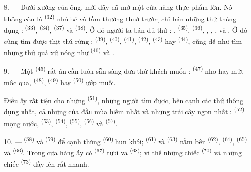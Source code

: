 8. --- Dưới xưởng của ông, mới đây đã mở một cửa hàng thực phẩm lớn. Nó không còn là
 \textsuperscript{(32)} nhỏ bé và tầm thường thuở trước, chỉ bán
những thứ thông dụng :  \textsuperscript{(33)}, 
\textsuperscript{(34)},  \textsuperscript{(37)} và 
\textsuperscript{(38)}. Ở đó người ta bán đủ thứ : ,  \textsuperscript{(35)},  \textsuperscript{(36)}, , , ,  và . Ở đó cũng tìm được thịt thú rừng :  \textsuperscript{(39)},
 \textsuperscript{(40)},  \textsuperscript{(41)},
 \textsuperscript{(42)},  \textsuperscript{(43)} hay
 \textsuperscript{(44)}, cũng dễ như tìm những thứ quả xứ nóng như
 \textsuperscript{(46)} và .

9. --- Một  \textsuperscript{(45)} rất ân cần luôn sẵn sàng đưa
thứ khách muốn :  \textsuperscript{(47)} nho hay mứt mộc qua, 
\textsuperscript{(48)},  \textsuperscript{(49)} hay  \textsuperscript{(50)} ướp muối.

Điều ấy rất tiện cho những  \textsuperscript{(51)}, những người tìm
được, bên cạnh các thứ thông dụng nhất, cả những của đầu mùa hiếm nhất và những trái cây
ngon nhất :  \textsuperscript{(52)} mọng nước, 
\textsuperscript{(53)},  \textsuperscript{(54)}, 
\textsuperscript{(55)},  \textsuperscript{(56)} và 
\textsuperscript{(57)}.

\VUsaut{4.0mm}
\VUsaut{3.0mm}

10. ---  \textsuperscript{(58)} và  \textsuperscript{(59)}
để cạnh thùng  \textsuperscript{(60)} hun khói; 
\textsuperscript{(61)} và  \textsuperscript{(63)} nằm bên 
\textsuperscript{(62)},  \textsuperscript{(64)}, 
\textsuperscript{(65)} và  \textsuperscript{(66)}. Trong cửa hàng ấy có
 \textsuperscript{(67)} tươi và  \textsuperscript{(68)}; vì
thế những chiếc  \textsuperscript{(70)} và những chiếc  \textsuperscript{(73)} đầy lên rất nhanh.


